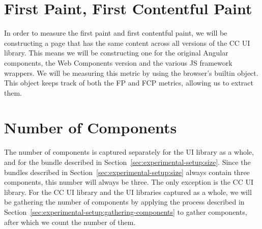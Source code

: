 \section{First Paint, First Contentful Paint}
In order to measure the first paint and first contentful paint, we will be constructing a page that has the same content across all versions of the CC UI library. This means we will be constructing one for the original Angular components, the Web Components version and the various JS framework wrappers. We will be measuring this metric by using the browser's builtin  object. This object keeps track of both the FP and FCP metrics, allowing us to extract them.

\section{Number of Components}
The number of components is captured separately for the UI library as a whole, and for the bundle described in Section~\ref{sec:experimental-setup:size}. Since the bundles described in Section~\ref{sec:experimental-setup:size} always contain three components, this number will always be three. The only exception is the CC UI library. For the CC UI library and the UI libraries captured as a whole, we will be gathering the number of components by applying the process described in Section~\ref{sec:experimental-setup:gathering-components} to gather components, after which we count the number of them.